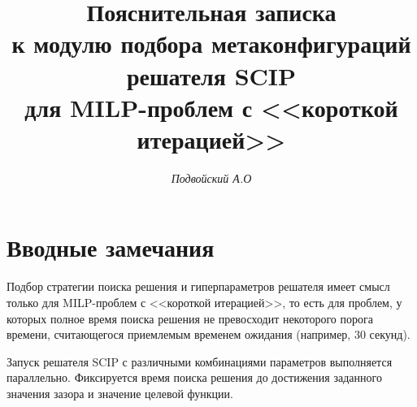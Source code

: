 \documentclass[%
	11pt,
	a4paper,
	utf8,
		]{article}
\begin{document}
\title{Пояснительная записка\\{\large к модулю подбора метаконфигураций решателя SCIP \\для MILP-проблем с <<короткой итерацией>>}}

\author{\itshape Подвойский А.О}


\date{}
\maketitle

\thispagestyle{fancy}



\tableofcontents

\section{Вводные замечания}

Подбор стратегии поиска решения и гиперпараметров решателя имеет смысл только для MILP-проблем с <<короткой итерацией>>, то есть для проблем, у которых полное время поиска решения не превосходит некоторого порога времени, считающегося приемлемым временем ожидания (например, 30 секунд).

Запуск решателя SCIP с различными комбинациями параметров выполняется параллельно. Фиксируется время поиска решения до достижения заданного значения зазора и значение целевой функции.
\end{document}
